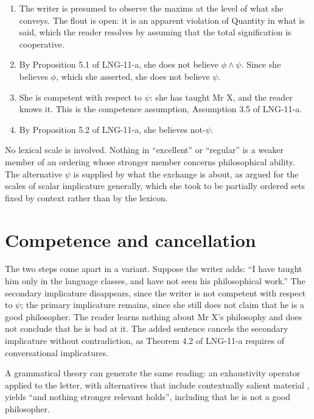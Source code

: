 \documentclass{situationist-preprint}
\begin{document}
\begin{enumerate}
\item The writer is presumed to observe the maxims at the level of what she conveys. The flout is open: it is an apparent violation of Quantity in what is said, which the reader resolves by assuming that the total signification is cooperative.
\item By Proposition 5.1 of LNG-11-a, she does not believe $\phi \wedge \psi$. Since she believes $\phi$, which she asserted, she does not believe $\psi$.
\item She is competent with respect to $\psi$: she has taught Mr X, and the reader knows it. This is the competence assumption, Assumption 3.5 of LNG-11-a.
\item By Proposition 5.2 of LNG-11-a, she believes not-$\psi$.
\end{enumerate}

No lexical scale is involved. Nothing in \enquote{excellent} or \enquote{regular} is a weaker member of an ordering whose stronger member concerns philosophical ability. The alternative $\psi$ is supplied by what the exchange is about, as \citet{Hirschberg1985} argued for the scales of scalar implicature generally, which she took to be partially ordered sets fixed by context rather than by the lexicon.

\section{Competence and cancellation}

The two steps come apart in a variant. Suppose the writer adds: \enquote{I have taught him only in the language classes, and have not seen his philosophical work.} The secondary implicature disappears, since the writer is not competent with respect to $\psi$; the primary implicature remains, since she still does not claim that he is a good philosopher. The reader learns nothing about Mr X's philosophy and does not conclude that he is bad at it. The added sentence cancels the secondary implicature without contradiction, as Theorem 4.2 of LNG-11-a requires of conversational implicatures.

\begin{objection}
A grammatical theory can generate the same reading: an exhaustivity operator applied to the letter, with alternatives that include contextually salient material \citep{Katzir2007}, yields \enquote{and nothing stronger relevant holds}, including that he is not a good philosopher.
\end{objection}
\end{document}
